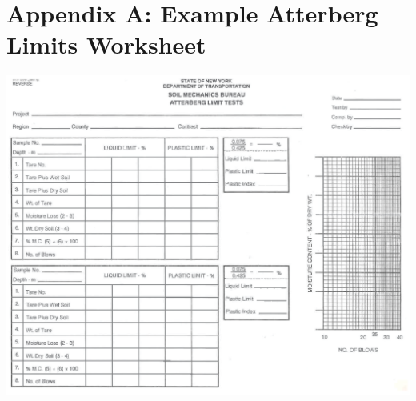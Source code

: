 \documentclass[12pt]{article}
\begin{document}
\pagebreak

\section*{Appendix A: Example Atterberg Limits Worksheet}
\label{AppendixA}
\begin{center}
    \includegraphics[width=1\linewidth]{GTM-7b24.eps}
\end{center}

\end{document}
